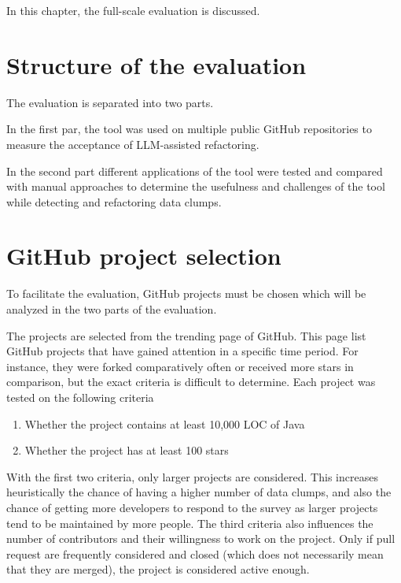 
In this chapter, the full-scale evaluation is discussed.
\section{Structure of the evaluation}

The evaluation is separated into two parts.

In the first par, the tool was used on multiple public GitHub repositories to measure the acceptance of \ac{LLM}-assisted refactoring.

In the second part different applications of the tool were tested and compared with manual approaches to determine the usefulness and challenges of the tool while detecting and refactoring data clumps.





\section{GitHub project selection}\label{sec:github_projects}

To facilitate the evaluation, GitHub projects must be chosen which will be analyzed in the two parts of the evaluation. 


The projects are selected from the trending page of GitHub. This page list GitHub projects that have gained attention in a specific time period. For instance, they were forked comparatively often or received more stars in comparison, but the exact criteria is difficult to determine. Each project was tested on the following criteria
\begin{enumerate}
    \item Whether the project contains at least  10,000 \ac{LOC} of Java
        \item Whether the project  has at least 100 stars

\end{enumerate}

With the first two criteria,  only larger projects are considered. This increases heuristically the chance of having a higher number of data clumps, and also the chance of getting more developers to respond to the survey as larger projects tend to be maintained by more people. The third criteria also influences the number of contributors and their willingness to work on the project. Only if pull request are frequently considered and closed (which does not necessarily mean that they are merged), the project is considered active enough. 


